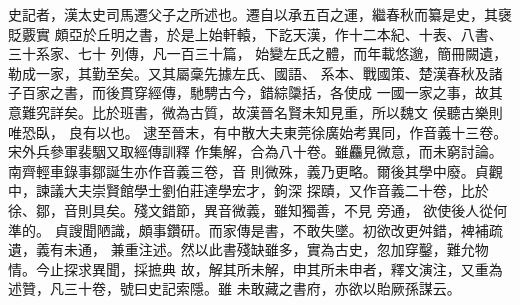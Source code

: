 %
%
%


史記者，漢太史司馬遷父子之所述也。遷自以承五百之運，繼春秋而纂是史，其襃貶覈實
頗亞於丘明之書，於是上始軒轅，下訖天漢，作十二本紀、十表、八書、三十系家、七十
列傳，凡一百三十篇，
%
%
始變左氏之體，而年載悠邈，簡冊闕遺，勒成一家，其勤至矣。又其屬稾先據左氏、國語、
系本、戰國策、楚漢春秋及諸子百家之書，而後貫穿經傳，馳騁古今，錯綜櫽括，各使成
一國一家之事，故其意難究詳矣。比於班書，微為古質，故漢晉名賢未知見重，所以魏文
侯聽古樂則唯恐臥，
%
良有以也。
%
\parswitch
%
逮至晉末，有中散大夫東莞徐廣始考異同，作音義十三卷。宋外兵參軍裴駰又取經傳訓釋
作集解，合為八十卷。雖麤見微意，而未窮討論。南齊輕車錄事鄒誕生亦作音義三卷，音
則微殊，義乃更略。爾後其學中廢。貞觀中，諫議大夫崇賢館學士劉伯莊達學宏才，鉤深
探賾，又作音義二十卷，比於徐、鄒，音則具矣。殘文錯節，異音微義，雖知獨善，不見
旁通，
%
%
欲使後人從何準的。
%
\parswitch
%
貞謏聞陋識，頗事鑽研。而家傳是書，不敢失墜。初欲改更舛錯，裨補疏遺，義有未通，
兼重注述。然以此書殘缺雖多，實為古史，忽加穿鑿，難允物情。今止探求異聞，採摭典
%
故，解其所未解，申其所未申者，釋文演注，又重為述贊，凡三十卷，號曰史記索隱。雖
未敢藏之書府，亦欲以貽厥孫謀云。
%


